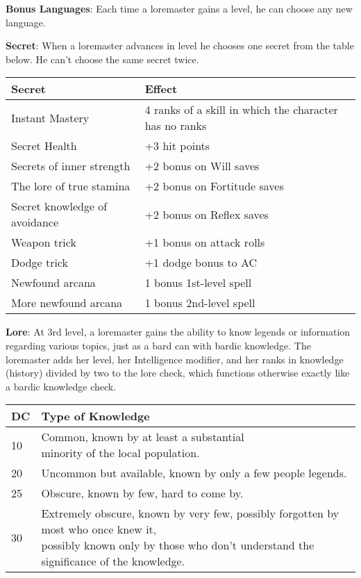 \textbf{Bonus Languages}: Each time a loremaster gains a level, he can choose any new language.

\textbf{Secret}: When a loremaster advances in level he chooses one secret from the table below. He can't choose the same secret twice.

\begin{center}
\begin{adjustwidth}{-4cm}{}
\begin{small}
\begin{tabular}{| l | l |}
\hline
Secret &Effect \\
\hline
Instant Mastery &4 ranks of a skill in which the character has no ranks \\
Secret Health &+3 hit points \\
Secrets of inner strength &+2 bonus on Will saves \\
The lore of true stamina &+2 bonus on Fortitude saves \\
Secret knowledge of avoidance &+2 bonus on Reflex saves \\
Weapon trick &+1 bonus on attack rolls \\
Dodge trick &+1 dodge bonus to AC \\
Newfound arcana &1 bonus 1st-level spell \\
More newfound arcana &1 bonus 2nd-level spell \\
\hline
\end{tabular}
\end{small}
\end{adjustwidth}
\end{center}

\textbf{Lore}: At 3rd level, a loremaster gains the ability to know legends or information regarding various topics, just as a bard can with bardic knowledge. The loremaster adds her level, her Intelligence modifier, and her ranks in knowledge (history) divided by two to the lore check, which functions otherwise exactly like a bardic knowledge check.

\begin{center}
\begin{adjustwidth}{-4cm}{}
\begin{small}
\begin{tabular}{| l | l |}
\hline
DC &Type of Knowledge \\
\hline
10 &\makecell{Common, known by at least a substantial\\ minority of the local population.} \\
20 &Uncommon but available, known by only a few people legends. \\
25 &Obscure, known by few, hard to come by. \\
30 &\makecell{Extremely obscure, known by very few, possibly forgotten by most who once knew it,\\ possibly known only by those who don't understand the significance of the knowledge.} \\
\hline
\end{tabular}
\end{small}
\end{adjustwidth}
\end{center}

